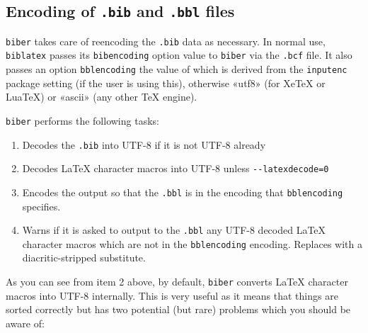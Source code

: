 \documentclass{ltxdockit}
\begin{document}
\subsection{Encoding of \verb+.bib+ and \verb+.bbl+ files}

\verb+biber+ takes care of reencoding the \verb+.bib+ data as
necessary. In normal use, \verb+biblatex+ passes its
\verb+bibencoding+ option value to \verb+biber+ via the \verb+.bcf+
file. It also passes an option \verb+bblencoding+ the value of which
is derived from the \verb+inputenc+ package setting (if the user is
using this), otherwise «utf8» (for XeTeX or LuaTeX) or «ascii» (any
other TeX engine).

\noindent \verb+biber+ performs the following tasks:

\begin{enumerate}
\item Decodes the \verb+.bib+ into UTF-8 if it is not UTF-8 already
\item Decodes LaTeX character macros into UTF-8 unless \verb+--latexdecode=0+
\item Encodes the output so that the \verb+.bbl+ is in
  the encoding that \verb+bblencoding+ specifies.
\item Warns if it is asked to output to the \verb+.bbl+ any UTF-8
  decoded LaTeX character macros which are not in the
  \verb+bblencoding+ encoding. Replaces with a diacritic-stripped substitute.
\end{enumerate}

\noindent As you can see from item 2 above, by default, \verb+biber+
converts LaTeX character macros into UTF-8 internally. This is very
useful as it means that things are sorted correctly but has two
potential (but rare) problems which you should be aware of:
\end{document}
